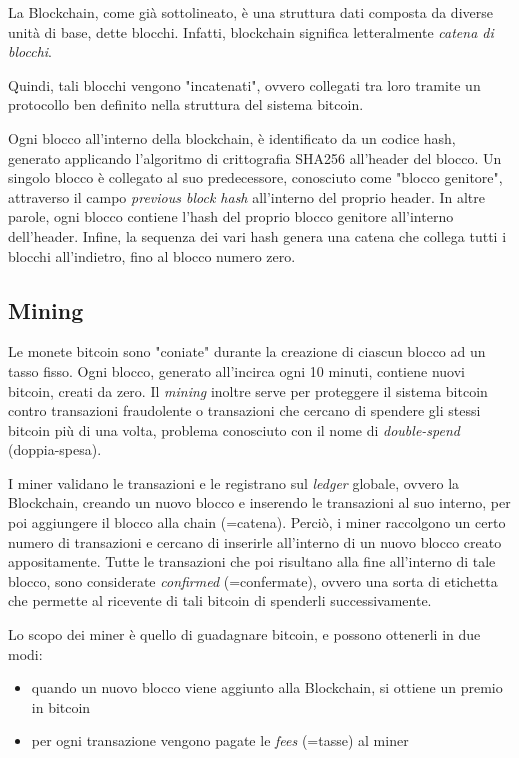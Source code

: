 La Blockchain, come già sottolineato, è una struttura dati composta da diverse unità di base, dette blocchi. Infatti, blockchain significa letteralmente \textit{catena di blocchi}.

Quindi, tali blocchi vengono "incatenati", ovvero collegati tra loro tramite un protocollo ben definito nella struttura del sistema bitcoin. 

Ogni blocco all'interno della blockchain, è identificato da un codice hash, generato applicando l'algoritmo di crittografia SHA256 all'header del blocco. Un singolo blocco è collegato al suo predecessore, conosciuto come "blocco genitore", attraverso il campo \textit{previous block hash} all'interno del proprio header. In altre parole, ogni blocco contiene l'hash del proprio blocco genitore all'interno dell'header. Infine, la sequenza dei vari hash genera una catena che collega tutti i blocchi all'indietro, fino al blocco numero zero.\cite{antonopoulos2014mastering}

\subsection{Mining}

Le monete bitcoin sono "coniate" durante la creazione di ciascun blocco ad un tasso fisso. Ogni blocco, generato all'incirca ogni 10 minuti, contiene nuovi bitcoin, creati da zero.
Il \textit{mining} inoltre serve per proteggere il sistema bitcoin contro transazioni fraudolente o transazioni che cercano di spendere gli stessi bitcoin più di una volta, problema conosciuto con il nome di \textit{double-spend} (doppia-spesa).

I miner validano le transazioni e le registrano sul \textit{ledger} globale, ovvero la Blockchain, creando un nuovo blocco e inserendo le transazioni al suo interno, per poi aggiungere il blocco alla chain (=catena). Perciò, i miner raccolgono un certo numero di transazioni e cercano di inserirle all'interno di un nuovo blocco creato appositamente. Tutte le transazioni che poi risultano alla fine all'interno di tale blocco, sono considerate \textit{confirmed} (=confermate), ovvero una sorta di etichetta che permette al ricevente di tali bitcoin di spenderli successivamente.

Lo scopo dei miner è quello di guadagnare bitcoin, e possono ottenerli in due modi: 
\begin{itemize}
	\item quando un nuovo blocco viene aggiunto alla Blockchain, si ottiene un premio in bitcoin
	\item per ogni transazione vengono pagate le \textit{fees} (=tasse) al miner
\end{itemize}


